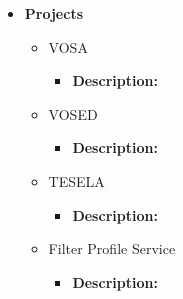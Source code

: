 \documentclass[11pt]{article}
\begin{document}
                \begin{itemize}
                    \item \textbf{Projects}
                        \begin{itemize}
                            \item VOSA
                                \begin{itemize}
                                    \item \textbf{Description:} 
                                \end{itemize}
                            \item VOSED
                                \begin{itemize}
                                    \item \textbf{Description:} 
                                \end{itemize}
                            \item TESELA
                                \begin{itemize}
                                    \item \textbf{Description:} 
                                \end{itemize}
                            \item Filter Profile Service
                                \begin{itemize}
                                    \item \textbf{Description:} 
                                \end{itemize}
                        \end{itemize}
                \end{itemize}
\end{document}
